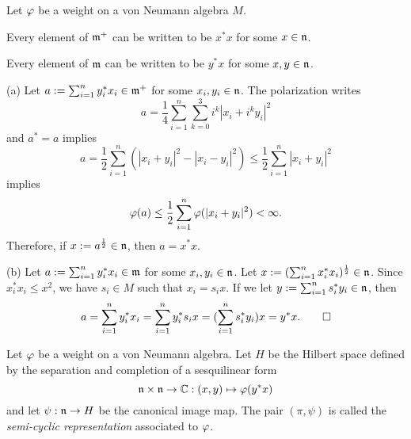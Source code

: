 \documentclass{../../small}
\begin{document}
\begin{prop}
Let $\varphi$ be a weight on a von Neumann algebra $M$.
\begin{parts}
\item Every element of $\mathfrak{m}^+$ can be written to be $x^*x$ for some $x\in\mathfrak{n}$.
\item Every element of $\mathfrak{m}$ can be written to be $y^*x$ for some $x,y\in\mathfrak{n}$.
\end{parts}
\end{prop}
\begin{pf}
(a)
Let $a:=\sum_{i=1}^ny_i^*x_i\in\mathfrak{m}^+$ for some $x_i,y_i\in\mathfrak{n}$.
The polarization writes
\[a=\frac14\sum_{i=1}^n\sum_{k=0}^3i^k|x_i+i^ky_i|^2\]
and $a^*=a$ implies
\[a=\frac12\sum_{i=1}^n(|x_i+y_i|^2-|x_i-y_i|^2)\le\frac12\sum_{i=1}^n|x_i+y_i|^2\]
implies
\[\varphi(a)\le\frac12\sum_{i=1}^n\varphi(|x_i+y_i|^2)<\infty.\]
Therefore, if $x:=a^{\frac12}\in\mathfrak{n}$, then $a=x^*x$.

(b)
Let $a:=\sum_{i=1}^ny_i^*x_i\in\mathfrak{m}$ for some $x_i,y_i\in\mathfrak{n}$.
Let $x:=(\sum_{i=1}^nx_i^*x_i)^{\frac12}\in\mathfrak{n}$.
Since $x_i^*x_i\le x^2$, we have $s_i\in M$ such that $x_i=s_ix$.
If we let $y:=\sum_{i=1}^ns_i^*y_i\in\mathfrak{n}$, then
\[a=\sum_{i=1}^ny_i^*x_i=\sum_{i=1}^ny_i^*s_ix=(\sum_{i=1}^ns_i^*y_i)x=y^*x.\qedhere\]
\end{pf}


\begin{defn}
Let $\varphi$ be a weight on a von Neumann algebra.
Let $H$ be the Hilbert space defined by the separation and completion of a sesquilinear form
\[\mathfrak{n}\times\mathfrak{n}\to\mathbb{C}:(x,y)\mapsto\varphi(y^*x)\]
and let $\psi:\mathfrak{n}\to H$ be the canonical image map.
The pair $(\pi,\psi)$ is called the \emph{semi-cyclic representation} associated to $\varphi$.
\end{defn}
\end{document}

